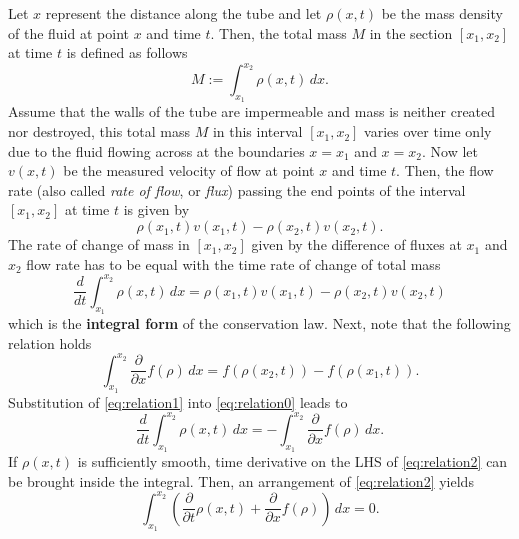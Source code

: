 \documentclass[12pt]{article}
\begin{document}
Let $x$ represent the distance along the tube and let $\rho(x,t)$ be the mass density of the 
fluid at point $x$ and time $t$. Then, the total mass $M$ in the section 
$[x_{1},x_{2}]$ at time $t$ is defined as follows
\begin{equation}
	M := \int_{x_{1}}^{x_{2}} \rho(x,t)\,dx.
\end{equation}
Assume that the walls of the tube are impermeable and mass is neither created nor destroyed, 
this total mass $M$ in this interval $[x_1,x_2]$ varies over time only due to the fluid flowing
across at the boundaries $x=x_{1}$ and $x=x_{2}$. 
Now let $v(x,t)$ be the measured velocity of flow at point $x$ and time $t$.
Then, the flow rate (also called \emph{rate of flow}, or \emph{flux})
passing the end points of the interval $[x_{1},x_{2}]$ at time $t$ is given by
\begin{equation}
	\rho(x_{1},t)v(x_{1},t)-\rho(x_{2},t)v(x_{2},t).
\end{equation}
The rate of change of mass in $[x_{1},x_{2}]$ given by the difference of fluxes at 
$x_1$ and $x_2$ flow rate has to be equal with the time rate of change of total mass
\begin{equation}\label{eq:relation0}
	\boxed{
		\frac{d}{dt}\int_{x_{1}}^{x_{2}} \rho(x,t)\,dx 
		= \rho(x_{1},t)v(x_{1},t)-\rho(x_{2},t)v(x_{2},t)
	}
\end{equation}
which is the \textbf{integral form} of the conservation law. Next, note that the following relation holds
\begin{equation}\label{eq:relation1}
	\int_{x_{1}}^{x_{2}} \frac{\partial}{\partial x}f(\rho)\,dx 
	= f(\rho(x_{2},t))-f(\rho(x_{1},t)).
\end{equation}
Substitution of \eqref{eq:relation1} into \eqref{eq:relation0} leads to
\begin{equation}\label{eq:relation2}
	\frac{d}{dt}\int_{x_{1}}^{x_{2}} \rho(x,t)\,dx 
	= -\int_{x_{1}}^{x_{2}}\frac{\partial}{\partial x}f(\rho)\,dx.
\end{equation}
If $\rho(x,t)$ is sufficiently smooth, time derivative on the LHS of \eqref{eq:relation2}
can be brought inside the integral. Then, an arrangement of \eqref{eq:relation2} yields
\begin{equation}\label{eq:relation3}
	\int_{x_{1}}^{x_{2}}
	\left(\frac{\partial}{\partial t}\rho(x,t) + \frac{\partial}{\partial x}f(\rho)\right)\,dx 
	= 0.
\end{equation}
\end{document}
